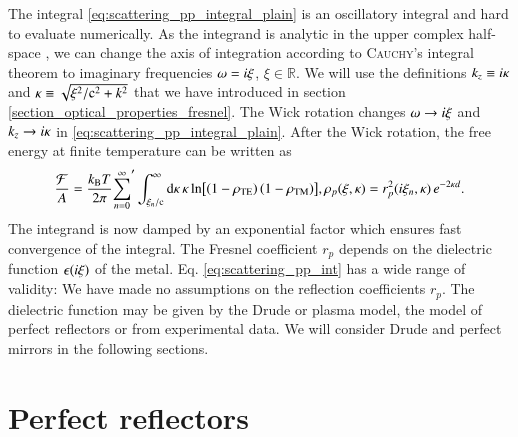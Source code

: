 The integral \eqref{eq:scattering_pp_integral_plain} is an oscillatory integral
and hard to evaluate numerically. As the integrand is analytic in the upper
complex half-space \cite{LossyOpticalCavities}, we can change the axis of
integration according to \textsc{Cauchy}'s integral theorem to imaginary
frequencies $\omega = i \xi$, $\xi \in \mathbb{R}$. We will use the
definitions $k_z \equiv i\kappa$ and $\kappa \equiv \sqrt{\xi^2/\mathrm{c}^2+k^2}$
that we have introduced in section \ref{section_optical_properties_fresnel}.
The Wick rotation changes 
$\omega \to i \xi$ and $k_z \to i\kappa$
in \eqref{eq:scattering_pp_integral_plain}. After the Wick rotation, the free energy
at finite temperature can be written as
\begin{equation}
\label{eq:scattering_pp_int}
\frac{\mathcal{F}}{A} = \frac{k_\text{B} T}{2\pi} {\sum_{n=0}^\infty}^\prime \int_{\xi_n/\mathrm{c}}^\infty \mathrm{d}\kappa \, \kappa \, \text{ln}{\left[\left(1-\rho_{\mathrm{TE}}\right)\left(1-\rho_{\mathrm{TM}}\right)\right]}, \\ \rho_p(\xi,\kappa) = r_p^2(i\xi_n,\kappa) \, e^{-2\kappa d}.
\end{equation}
The integrand is now damped by an exponential factor which ensures fast
convergence of the integral. The Fresnel coefficient $r_p$
depends on the dielectric function $\epsilon(i\xi)$ of the metal.
Eq. \eqref{eq:scattering_pp_int} has a wide range of validity: We have
made no assumptions on the reflection coefficients $r_p$. The dielectric
function may be given by the Drude or plasma model, the model of perfect
reflectors or from experimental data.
We will consider Drude and perfect mirrors in the following sections.


\section{Perfect reflectors}

